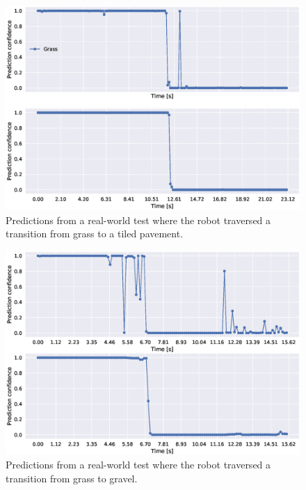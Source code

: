 \begin{figure}
	\centering
	\includegraphics[scale=0.5]{figs_temp/transition_grass_tiles_grass}
	\caption{Predictions from a real-world test where the robot traversed a transition from grass to a tiled pavement.} 
	\label{fig:trans_tgtg}
\end{figure}

\begin{figure}
	\centering
	\includegraphics[scale=0.5]{figs_temp/transition_grass_gravel2}
	\caption{Predictions from a real-world test where the robot traversed a transition from grass to gravel.}
	\label{fig:trans_gg}
\end{figure}

